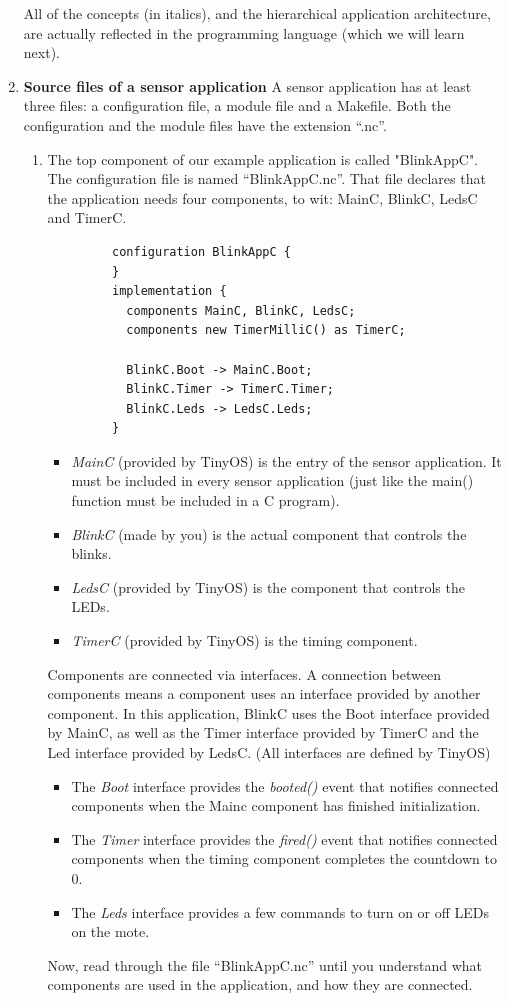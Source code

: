 \documentclass[letterpaper,12pt]{article}
\begin{document}
\begin{enumerate}
   All of the concepts (in italics), and the hierarchical application architecture, are actually reflected in the programming language (which we will learn next).

\item \textbf{Source files of a sensor application}
   A sensor application has at least three files: a configuration file, a module file and a Makefile.
   Both the configuration and the module files have the extension “.nc”.

   \begin{enumerate}
      \item The top component of our example application is called "BlinkAppC".
         The configuration file is named “BlinkAppC.nc”. That file declares that the application needs four components, to wit: MainC, BlinkC, LedsC and TimerC.
         \begin{lstlisting}
         configuration BlinkAppC {
         }
         implementation {
           components MainC, BlinkC, LedsC;
           components new TimerMilliC() as TimerC;

           BlinkC.Boot -> MainC.Boot;
           BlinkC.Timer -> TimerC.Timer;
           BlinkC.Leds -> LedsC.Leds;
         }
         \end{lstlisting}
         \begin{itemize}
             \item \emph{MainC} (provided by TinyOS) is the entry of the sensor application. It must be included in every sensor application (just like the main() function must be included in a C program).
             \item \emph{BlinkC} (made by you) is the actual component that controls the blinks.
             \item \emph{LedsC} (provided by TinyOS) is the component that controls the LEDs.
             \item \emph{TimerC} (provided by TinyOS) is the timing component.
         \end{itemize}
         Components are connected via interfaces. A connection between components means a component uses an interface provided by another component.
         In this application, BlinkC uses the Boot interface provided by MainC, as well as the Timer interface provided by TimerC and the Led interface provided by LedsC. (All interfaces are defined by TinyOS)
         \begin{itemize}
            \item The \emph{Boot} interface provides the \emph{booted()} event that notifies connected components when the Mainc component has finished initialization.
            \item The \emph{Timer} interface provides the \emph{fired()} event that notifies connected components when the timing component completes the countdown to 0.
            \item The \emph{Leds} interface provides a few commands to turn on or off LEDs on the mote.
         \end{itemize}
         Now, read through the file “BlinkAppC.nc” until you understand what components are used in the application, and how they are connected.


\end{enumerate}
\end{enumerate}
\end{document}

